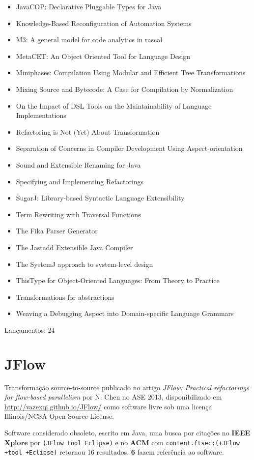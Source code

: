 \begin{itemize}
\item JavaCOP: Declarative Pluggable Types for Java
\item Knowledge-Based Reconfiguration of Automation Systems
\item M3: A general model for code analytics in rascal
\item MetaCET: An Object Oriented Tool for Language Design
\item Miniphases: Compilation Using Modular and Efficient Tree Transformations
\item Mixing Source and Bytecode: A Case for Compilation by Normalization
\item On the Impact of DSL Tools on the Maintainability of Language Implementations
\item Refactoring is Not (Yet) About Transformation
\item Separation of Concerns in Compiler Development Using Aspect-orientation
\item Sound and Extensible Renaming for Java
\item Specifying and Implementing Refactorings
\item SugarJ: Library-based Syntactic Language Extensibility
\item Term Rewriting with Traversal Functions
\item The Fika Parser Generator
\item The Jastadd Extensible Java Compiler
\item The SystemJ approach to system-level design
\item ThisType for Object-Oriented Languages: From Theory to Practice
\item Transformations for abstractions
\item Weaving a Debugging Aspect into Domain-specific Language Grammars
\end{itemize}

Lançamentos: 24

\section{JFlow}

Transformação source-to-source
publicado no artigo {\it JFlow: Practical refactorings for flow-based parallelism}
por N. Chen
no ASE 2013,
disponibilizado em \url{http://vazexqi.github.io/JFlow/}
como software livre
sob uma licença Illinois/NCSA Open Source License.

Software considerado obsoleto,
escrito em Java,
uma busca por citações no {\bf IEEE Xplore} por
\texttt{(JFlow tool Eclipse)}
e no {\bf ACM} com
\texttt{content.ftsec:(+JFlow +tool +Eclipse)}
retornou
16 resultados,
{\bf 6} fazem referência ao software.

